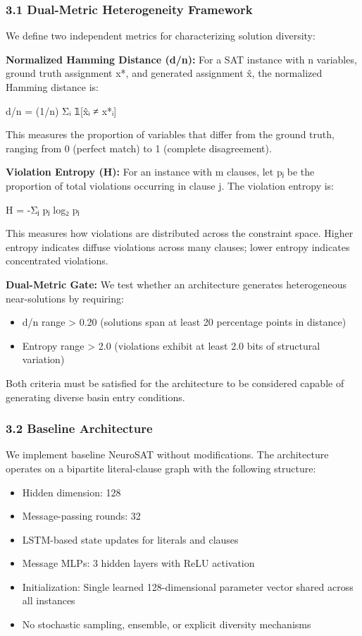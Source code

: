 
\subsubsection{3.1 Dual-Metric Heterogeneity Framework}

We define two independent metrics for characterizing solution diversity:

\textbf{Normalized Hamming Distance (d/n):} For a SAT instance with n variables, ground truth assignment x*, and generated assignment x̂, the normalized Hamming distance is:

d/n = (1/n) Σᵢ 𝟙[x̂ᵢ ≠ x*ᵢ]

This measures the proportion of variables that differ from the ground truth, ranging from 0 (perfect match) to 1 (complete disagreement).

\textbf{Violation Entropy (H):} For an instance with m clauses, let pⱼ be the proportion of total violations occurring in clause j. The violation entropy is:

H = -Σⱼ pⱼ log₂ pⱼ

This measures how violations are distributed across the constraint space. Higher entropy indicates diffuse violations across many clauses; lower entropy indicates concentrated violations.

\textbf{Dual-Metric Gate:} We test whether an architecture generates heterogeneous near-solutions by requiring:
\begin{itemize}
\item d/n range > 0.20 (solutions span at least 20 percentage points in distance)
\item Entropy range > 2.0 (violations exhibit at least 2.0 bits of structural variation)
\end{itemize}

Both criteria must be satisfied for the architecture to be considered capable of generating diverse basin entry conditions.

\subsubsection{3.2 Baseline Architecture}

We implement baseline NeuroSAT without modifications. The architecture operates on a bipartite literal-clause graph with the following structure:

\begin{itemize}
\item Hidden dimension: 128
\item Message-passing rounds: 32
\item LSTM-based state updates for literals and clauses
\item Message MLPs: 3 hidden layers with ReLU activation
\item Initialization: Single learned 128-dimensional parameter vector shared across all instances
\item No stochastic sampling, ensemble, or explicit diversity mechanisms
\end{itemize}

